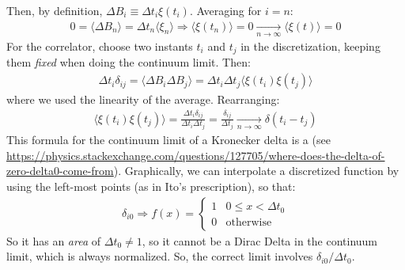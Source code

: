 \documentclass[../template.tex]{subfiles}
\begin{document}
\begin{exo}
    Then, by definition, $\Delta B_i \equiv \Delta t_i \xi(t_i)$. Averaging for $i=n$:
    \begin{align*}
        0=\langle \Delta B_n \rangle = \Delta t_n \langle \xi_n \rangle  \Rightarrow \langle \xi(t_n) \rangle = 0  \xrightarrow[n \to \infty]{} \langle \xi(t) \rangle = 0
    \end{align*} 
    For the correlator, choose two instants $t_i$ and $t_j$ in the discretization, keeping them \textit{fixed} when doing the continuum limit. Then:
    \begin{align*}
        \Delta t_i \delta_{ij} = \langle \Delta B_i \Delta B_j \rangle = \Delta t_i \Delta t_j \langle \xi(t_i) \xi(t_j) \rangle
    \end{align*} 
    where we used the linearity of the average. Rearranging:
    \begin{align*}
        \langle \xi(t_i) \xi(t_j)\rangle = \frac{\Delta t_i \delta_{ij}}{\Delta t_i \Delta t_j } = \frac{\delta_{ij}}{\Delta t_j}  \xrightarrow[n \to \infty]{} \delta(t_i -t_j)
    \end{align*}
    This formula for the continuum limit of a Kronecker delta is a  (see \url{https://physics.stackexchange.com/questions/127705/where-does-the-delta-of-zero-delta0-come-from}).  Graphically, we can interpolate a discretized function by using the left-most points (as in Ito's prescription), so that:
    \begin{align*}
        \delta_{i0} \Rightarrow f(x) = \begin{cases} 
            1 & 0 \leq x < \Delta t_0\\
            0 & \text{otherwise}
        \end{cases}
    \end{align*}
    So it has an \textit{area} of $\Delta t_0 \neq 1$, so it cannot be a Dirac Delta in the continuum limit, which is always normalized. So, the correct limit involves $\delta_{i0}/\Delta t_0$. %
\end{exo}
\end{document}
